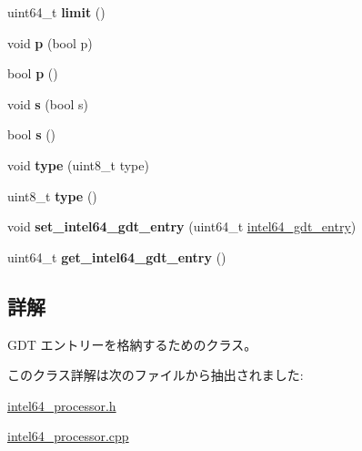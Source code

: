 \begin{DoxyCompactItemize}
\item 
\hypertarget{classintel64__gdt__entry_af24a34f4978baf7b70825f7d558b3c5d}{}uint64\+\_\+t {\bfseries limit} ()\label{classintel64__gdt__entry_af24a34f4978baf7b70825f7d558b3c5d}

\item 
\hypertarget{classintel64__gdt__entry_aab946025f33ed6b5ca947bb4b4dbd1cc}{}void {\bfseries p} (bool p)\label{classintel64__gdt__entry_aab946025f33ed6b5ca947bb4b4dbd1cc}

\item 
\hypertarget{classintel64__gdt__entry_a0adf7b16955754751bfe59a05ef692a5}{}bool {\bfseries p} ()\label{classintel64__gdt__entry_a0adf7b16955754751bfe59a05ef692a5}

\item 
\hypertarget{classintel64__gdt__entry_af6430996694a587bdc57335297c8e9cd}{}void {\bfseries s} (bool s)\label{classintel64__gdt__entry_af6430996694a587bdc57335297c8e9cd}

\item 
\hypertarget{classintel64__gdt__entry_a75d1cf3eb67ccf2f306767f192e351de}{}bool {\bfseries s} ()\label{classintel64__gdt__entry_a75d1cf3eb67ccf2f306767f192e351de}

\item 
\hypertarget{classintel64__gdt__entry_a428581468922f870546bf869f2cbcd9d}{}void {\bfseries type} (uint8\+\_\+t type)\label{classintel64__gdt__entry_a428581468922f870546bf869f2cbcd9d}

\item 
\hypertarget{classintel64__gdt__entry_aa3a3105645899970210c9d34666308c3}{}uint8\+\_\+t {\bfseries type} ()\label{classintel64__gdt__entry_aa3a3105645899970210c9d34666308c3}

\item 
\hypertarget{classintel64__gdt__entry_a5ddcc33ab1383647c7dba9da5ac4c939}{}void {\bfseries set\+\_\+intel64\+\_\+gdt\+\_\+entry} (uint64\+\_\+t \hyperlink{classintel64__gdt__entry}{intel64\+\_\+gdt\+\_\+entry})\label{classintel64__gdt__entry_a5ddcc33ab1383647c7dba9da5ac4c939}

\item 
\hypertarget{classintel64__gdt__entry_a8731545e6e0a5414574e33863cfd5960}{}uint64\+\_\+t {\bfseries get\+\_\+intel64\+\_\+gdt\+\_\+entry} ()\label{classintel64__gdt__entry_a8731545e6e0a5414574e33863cfd5960}

\end{DoxyCompactItemize}


\subsection{詳解}
G\+D\+T エントリーを格納するためのクラス。 

このクラス詳解は次のファイルから抽出されました\+:\begin{DoxyCompactItemize}
\item 
\hyperlink{intel64__processor_8h}{intel64\+\_\+processor.\+h}\item 
\hyperlink{intel64__processor_8cpp}{intel64\+\_\+processor.\+cpp}\end{DoxyCompactItemize}
